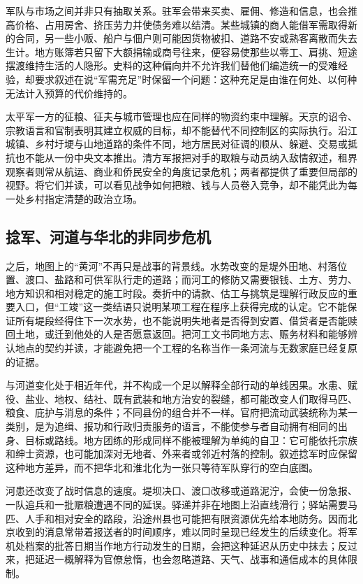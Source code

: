 军队与市场之间并非只有抽取关系。驻军会带来买卖、雇佣、修造和信息，也会推高价格、占用房舍、挤压劳力并使债务难以结清。某些城镇的商人能借军需取得新的合同，另一些小贩、船户与佃户则可能因货物被扣、道路不安或熟客离散而失去生计。地方账簿若只留下大额捐输或商号往来，便容易使那些以零工、肩挑、短途摆渡维持生活的人隐形。史料的这种偏向并不允许我们替他们编造统一的受难经验，却要求叙述在说“军需充足”时保留一个问题：这种充足是由谁在何处、以何种无法计入预算的代价维持的。

太平军一方的征粮、征夫与城市管理也应在同样的物资约束中理解。天京的诏令、宗教语言和官制表明其建立权威的目标，却不能替代不同控制区的实际执行。沿江城镇、乡村圩埂与山地道路的条件不同，地方居民对征调的顺从、躲避、交易或抵抗也不能从一份中央文本推出。清方军报把对手的取粮与动员纳入敌情叙述，租界观察者则常从航运、商业和侨民安全的角度记录危机；两者都提供了重要但局部的视野。将它们并读，可以看见战争如何把粮、钱与人员卷入竞争，却不能凭此为每一处乡村指定清楚的政治立场。

\subsection{捻军、河道与华北的非同步危机}

之后，地图上的“黄河”不再只是战事的背景线。水势改变的是堤外田地、村落位置、渡口、盐路和可供军队行走的道路；而河工的修防又需要银钱、土方、劳力、地方知识和相对稳定的施工时段。奏折中的请款、估工与挑筑是理解行政反应的重要入口，但“工竣”这一类结语只说明某项工程在程序上获得完成的认定。它不能保证所有堤段经得住下一次水势，也不能说明失地者是否得到安置、借贷者是否能赎回土地，或迁到他处的人是否愿意返回。把河工文书同地方志、赈务材料和能够辨认地点的契约并读，才能避免把一个工程的名称当作一条河流与无数家庭已经复原的证据。

与河道变化处于相近年代，并不构成一个足以解释全部行动的单线因果。水患、赋役、盐业、地权、结社、既有武装和地方治安的裂缝，都可能改变人们取得马匹、粮食、庇护与消息的条件；不同县份的组合并不一样。官府把流动武装统称为某一类别，是为追缉、报功和行政归责服务的语言，不能使参与者自动拥有相同的出身、目标或路线。地方团练的形成同样不能被理解为单纯的自卫：它可能依托宗族和绅士资源，也可能加深对无地者、外来者或邻近村落的控制。叙述捻军时应保留这种地方差异，而不把华北和淮北化为一张只等待军队穿行的空白底图。

河患还改变了战时信息的速度。堤坝决口、渡口改移或道路泥泞，会使一份急报、一队追兵和一批赈粮遭遇不同的延误。驿递并非在地图上沿直线滑行；驿站需要马匹、人手和相对安全的路段，沿途州县也可能把有限资源优先给本地防务。因而北京收到的消息常带着报送者的时间顺序，难以同时呈现已经发生的后续变化。将军机处档案的批答日期当作地方行动发生的日期，会把这种延迟从历史中抹去；反过来，把延迟一概解释为官僚怠惰，也会忽略道路、天气、战事和通信成本的具体限制。

